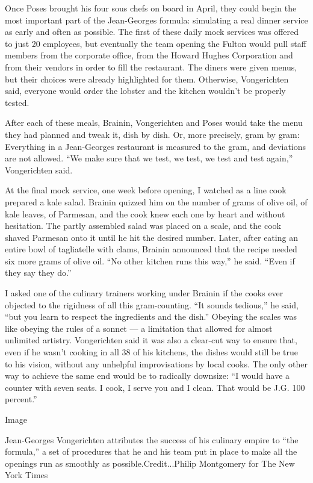 Once Poses brought his four sous chefs on board in April, they could
begin the most important part of the Jean-Georges formula: simulating a
real dinner service as early and often as possible. The first of these
daily mock services was offered to just 20 employees, but eventually the
team opening the Fulton would pull staff members from the corporate
office, from the Howard Hughes Corporation and from their vendors in
order to fill the restaurant. The diners were given menus, but their
choices were already highlighted for them. Otherwise, Vongerichten said,
everyone would order the lobster and the kitchen wouldn't be properly
tested.

After each of these meals, Brainin, Vongerichten and Poses would take
the menu they had planned and tweak it, dish by dish. Or, more
precisely, gram by gram: Everything in a Jean-Georges restaurant is
measured to the gram, and deviations are not allowed. ``We make sure
that we test, we test, we test and test again,'' Vongerichten said.

At the final mock service, one week before opening, I watched as a line
cook prepared a kale salad. Brainin quizzed him on the number of grams
of olive oil, of kale leaves, of Parmesan, and the cook knew each one by
heart and without hesitation. The partly assembled salad was placed on a
scale, and the cook shaved Parmesan onto it until he hit the desired
number. Later, after eating an entire bowl of tagliatelle with clams,
Brainin announced that the recipe needed six more grams of olive oil.
``No other kitchen runs this way,'' he said. ``Even if they say they
do.''

I asked one of the culinary trainers working under Brainin if the cooks
ever objected to the rigidness of all this gram-counting. ``It sounds
tedious,'' he said, ``but you learn to respect the ingredients and the
dish.'' Obeying the scales was like obeying the rules of a sonnet --- a
limitation that allowed for almost unlimited artistry. Vongerichten said
it was also a clear-cut way to ensure that, even if he wasn't cooking in
all 38 of his kitchens, the dishes would still be true to his vision,
without any unhelpful improvisations by local cooks. The only other way
to achieve the same end would be to radically downsize: ``I would have a
counter with seven seats. I cook, I serve you and I clean. That would be
J.G. 100 percent.''

Image

Jean-Georges Vongerichten attributes the success of his culinary empire
to ``the formula,'' a set of procedures that he and his team put in
place to make all the openings run as smoothly as
possible.Credit...Philip Montgomery for The New York Times

